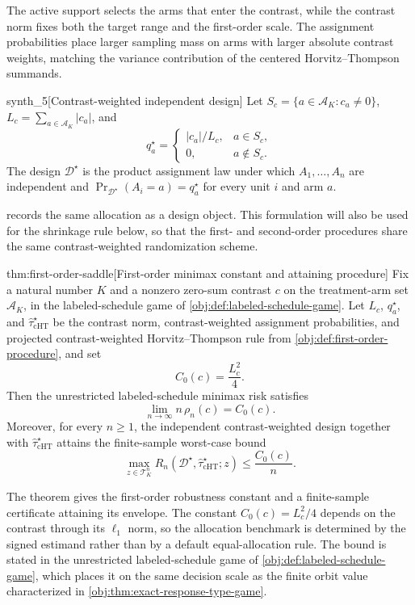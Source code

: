 \documentclass[11pt]{article}
\begin{document}
The active support  selects the arms that enter the contrast, while the contrast norm  fixes both the target range and the first-order scale. The assignment probabilities  place larger sampling mass on arms with larger absolute contrast weights, matching the variance contribution of the centered Horvitz--Thompson summands.

\begin{definitionv}{synth_5}[Contrast-weighted independent design]
Let \(S_c=\{a\in\mathcal A_K:c_a\ne0\}\), \(L_c=\sum_{a\in\mathcal A_K}|c_a|\), and
\[
q_a^\star=\begin{cases}|c_a|/L_c,&a\in S_c,\\ 0,&a\notin S_c.\end{cases}
\]
The design \(\mathcal D^\star\) is the product assignment law under which \(A_1,\ldots,A_n\) are independent and \(\Pr_{\mathcal D^\star}(A_i=a)=q_a^\star\) for every unit \(i\) and arm \(a\).
\end{definitionv}

 records the same allocation as a design object. This formulation will also be used for the shrinkage rule below, so that the first- and second-order procedures share the same contrast-weighted randomization scheme.

\begin{theoremv}{thm:first-order-saddle}[First-order minimax constant and attaining procedure]
Fix a natural number \(K\) and a nonzero zero-sum contrast \(c\) on the treatment-arm set \(\mathcal A_K\), in the labeled-schedule game of \cref{obj:def:labeled-schedule-game}. Let \(L_c\), \(q_a^\star\), and \(\widehat\tau_{\mathrm{cHT}}^\star\) be the contrast norm, contrast-weighted assignment probabilities, and projected contrast-weighted Horvitz--Thompson rule from \cref{obj:def:first-order-procedure}, and set
\[
C_0(c)=\frac{L_c^2}{4}.
\]
Then the unrestricted labeled-schedule minimax risk satisfies
\[
\lim_{n\to\infty} n\,\rho_n(c)=C_0(c).
\]
Moreover, for every \(n\ge 1\), the independent contrast-weighted design together with \(\widehat\tau_{\mathrm{cHT}}^\star\) attains the finite-sample worst-case bound
\[
\max_{z\in\mathcal T_K^n}
R_n(\mathcal D^\star,\widehat\tau_{\mathrm{cHT}}^\star;z)
\le
\frac{C_0(c)}{n}.
\]
\end{theoremv}

The theorem gives the first-order robustness constant and a finite-sample certificate attaining its envelope. The constant \(C_0(c)=L_c^2/4\) depends on the contrast through its \(\ell_1\) norm, so the allocation benchmark is determined by the signed estimand rather than by a default equal-allocation rule. The bound is stated in the unrestricted labeled-schedule game of \cref{obj:def:labeled-schedule-game}, which places it on the same decision scale as the finite orbit value characterized in \cref{obj:thm:exact-response-type-game}.
\end{document}
